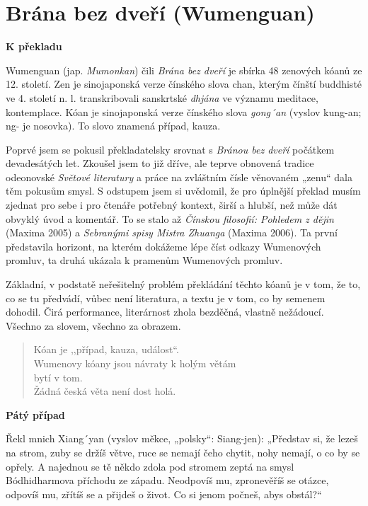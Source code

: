 \section{Brána bez dveří (Wumenguan)}

\noindent
\textbf{K překladu}

\noindent
Wumenguan (jap. \textit{Mumonkan}) čili \textit{Brána bez dveří} je sbírka 48 zenových kóanů ze 12. století. Zen je sinojaponská verze čínského slova chan, kterým čínští buddhisté ve 4. století n. l. transkribovali sanskrtské \textit{dhjána} ve významu meditace, kontemplace. Kóan je sinojaponská verze čínského slova \textit{gong´an} (vyslov kung-an; ng- je nosovka). To slovo znamená případ, kauza.

Poprvé jsem se pokusil překladatelsky srovnat s \textit{Bránou bez dveří} počátkem devadesátých let. Zkoušel jsem to již dříve, ale teprve obnovená tradice odeonovské \textit{Světové literatury} a práce na zvláštním čísle věnovaném „zenu“ dala těm pokusům smysl. S odstupem jsem si uvědomil, že pro úplnější překlad musím zjednat pro sebe i pro čtenáře potřebný kontext, širší a hlubší, než může dát obvyklý úvod a komentář. To se stalo až \textit{Čínskou filosofií: Pohledem z dějin} (Maxima 2005) a \textit{Sebranými spisy Mistra Zhuanga} (Maxima 2006). Ta první představila horizont, na kterém dokážeme lépe číst odkazy Wumenových promluv, ta druhá ukázala k pramenům Wumenových promluv. 

Základní, v podstatě neřešitelný problém překládání těchto kóanů je v tom, že to, co se tu předvádí, vůbec není literatura, a textu je v tom, co by semenem dohodil. Čirá performance, literárnost zhola bezděčná, vlastně nežádoucí. Všechno za slovem, všechno za obrazem. 

\begin{verse}
Kóan je ,,případ, kauza, událost``.\\
Wumenovy kóany jsou návraty k holým větám \\\hspace*{\fill}bytí v tom.\\
Žádná česká věta není dost holá.\\
\end{verse}

\bigskip

\noindent
\textbf{Pátý případ}

\noindent
Řekl mnich Xiang´yan (vyslov měkce, „polsky“: Siang-jen): „Představ si, že lezeš na strom, zuby se držíš větve, ruce se nemají čeho chytit, nohy nemají, o co by se opřely. A najednou se tě někdo zdola pod stromem zeptá na smysl Bódhidharmova příchodu ze západu. Neodpovíš mu, zpronevěříš se otázce, odpovíš mu, zřítíš se a přijdeš o život. Co si jenom počneš, abys obstál?“ 

